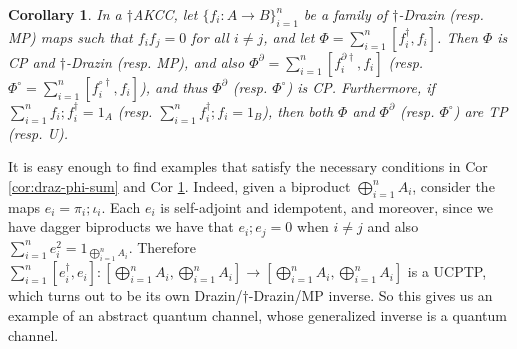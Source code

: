 \documentclass[submission,copyright,creativecommons]{eptcs}
\newtheorem{corollary}[observation]{Corollary}
\begin{document}
\begin{corollary}\label{cor:dag-draz-phi-sum} In a $\dagger$AKCC, let $\lbrace f_i: A \to B \rbrace^n_{i=1}$ be a family of $\dagger$-Drazin (resp. MP) maps such that $f_i f_j=0$ for all $i \neq j$, and let $\Phi = \sum\limits_{i=1}^n [f_i^\dagger,f_i]$. Then $\Phi$ is CP and $\dagger$-Drazin (resp. MP), and also $\Phi^\partial = \sum\limits_{i=1}^n [f_i^{\partial\dagger},f_i]$ (resp. $\Phi^\circ = \sum\limits_{i=1}^n [f_i^{\circ\dagger},f_i]$), and thus $\Phi^\partial$ (resp. $\Phi^\circ$) is CP. Furthermore, if $\sum\limits_{i=1}^n f_i;f_i^\dagger = 1_A$ (resp. $\sum\limits_{i=1}^n f_i^\dagger;f_i = 1_B$), then both $\Phi$ and $\Phi^\partial$ (resp. $\Phi^\circ$) are TP (resp. U). 
\end{corollary}

It is easy enough to find examples that satisfy the necessary conditions in Cor \ref{cor:draz-phi-sum} and Cor \ref{cor:dag-draz-phi-sum}. Indeed, given a biproduct $\bigoplus\limits^n_{i=1} A_i$, consider the maps $e_i=\pi_i;\iota_i$. Each $e_i$ is self-adjoint and idempotent, and moreover, since we have dagger biproducts we have that $e_i;e_j=0$ when $i \neq j$ and also $\sum^n_{i=1} e_i^2 = 1_{\bigoplus\limits^n_{i=1} A_i}$. Therefore $\sum\limits^n_{i=1} \left[ e_i^\dagger, e_i \right]: \left[\bigoplus\limits^n_{i=1} A_i, \bigoplus\limits^n_{i=1} A_i\right] \to \left[\bigoplus\limits^n_{i=1} A_i, \bigoplus\limits^n_{i=1} A_i\right]$ is a UCPTP, which turns out to be its own Drazin/$\dagger$-Drazin/MP inverse. So this gives us an example of an abstract quantum channel, whose generalized inverse is a quantum channel. 



\newpage 
\nocite{*}


\end{document}
